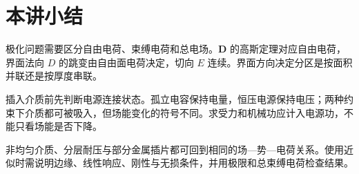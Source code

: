 \section{本讲小结}

极化问题需要区分自由电荷、束缚电荷和总电场。$\bm D$ 的高斯定理对应自由电荷，界面法向 $D$ 的跳变由自由面电荷决定，切向 $E$ 连续。界面方向决定分区是按面积并联还是按厚度串联。

插入介质前先判断电源连接状态。孤立电容保持电量，恒压电源保持电压；两种约束下介质都可被吸入，但场能变化的符号不同。求受力和机械功应计入电源功，不能只看场能是否下降。

非均匀介质、分层耐压与部分金属插片都可回到相同的场—势—电荷关系。使用近似时需说明边缘、线性响应、刚性与无损条件，并用极限和总束缚电荷检查结果。

